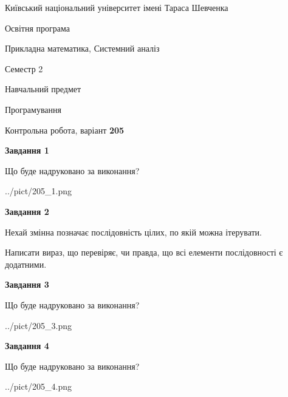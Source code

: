 \documentclass[12pt, ukrainian]{article}
\begin{document}
{{\begin {small}\par
{ \center  Київський національний університет імені Тараса Шевченка \par}
{\parbox {5 cm}{Освітня програма \hfill}{\parbox {8 cm}{Прикладна математика, Системний аналіз \hfill}}\parbox {5 cm}{\hfill Семестр 2}}\par
{\parbox {5 cm} {Навчальний предмет \hfill}\parbox {7 cm}{Програмування \hfill}\parbox {6cm}{\hfill}\par}\vspace{-7pt} \end{small}}{\center Контрольна робота, варіант  \No \textbf
{ 205 }\par}}
{
\begin {large}
{\begin {center}\textbf{Завдання 1}\end {center}}\par
Що буде надруковано за виконання?\par\par
\begin{center}
	{../pict/205_1.png}
\end{center}
\newpage

{\begin {center}\textbf{Завдання 2}\end {center}}\par
Нехай змінна  позначає послідовність цілих, по якій можна ітерувати.

Написати вираз, що перевіряє, чи правда, що всі елементи послідовності є додатни\-ми.\par
\newpage

{\begin {center}\textbf{Завдання 3}\end {center}}\par
Що буде надруковано за виконання?
\begin{center}
	{../pict/205_3.png}
\end{center}
\newpage

{\begin {center}\textbf{Завдання 4}\end {center}}\par
Що буде надруковано за виконання?\par
\begin{center}
	{../pict/205_4.png}
\end{center}
\newpage


\end{large}}
\end{document}
